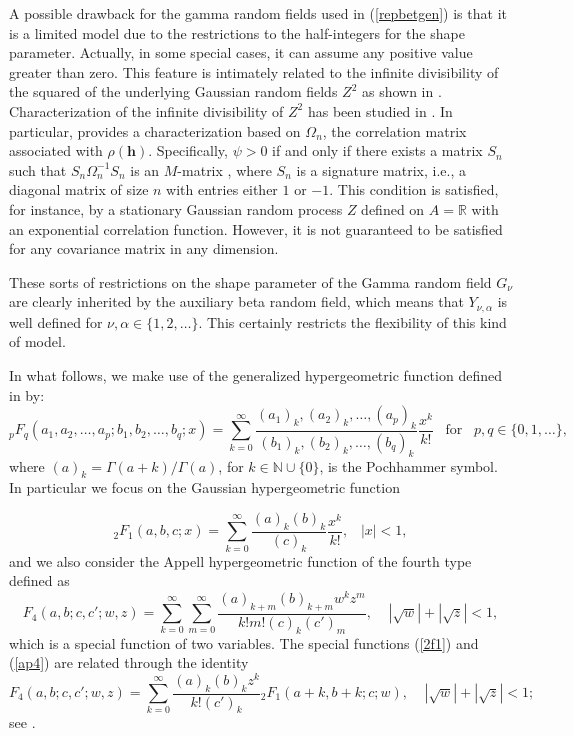 \documentclass[times,sort&compress,3p]{elsarticle}
\theoremstyle{plain}%
\theoremstyle{definition}
\def\NN{\mathbb{N}}
\def\hh{\bm{h}}
\def\RR{\mathbb{R}}
\begin{document}
A possible drawback for the gamma random fields used in (\ref{repbetgen}) is that it is a limited model due to the restrictions to the half-integers for the shape parameter. Actually, in some special  cases, it can assume any positive value greater than zero. This feature is intimately related to the infinite divisibility of the squared of the underlying Gaussian random fields $Z^2$ as shown in \cite{Kri:rao:1961}. Characterization of the infinite  divisibility of $Z^2$ has been studied in \cite{Bapat:1989,Eisenbaum:Kaspi:2006,Griffiths:1970,Vere-Jones:1997}. In particular, \citet{Bapat:1989} provides a characterization based on $\Omega_n$, the correlation matrix associated with $\rho(\hh)$. Specifically,  $\psi >0$ if and only if there exists a matrix $S_n$ such that $S_n\Omega_n^{-1}S_n$ is an $M$-matrix \citep{plee:1977}, where $S_n$ is a signature matrix, i.e., a diagonal matrix of size $n$ with entries either $1$ or $-1$. This condition is satisfied, for instance, by a stationary Gaussian random process $Z$ defined on $A=\RR$ with  an exponential correlation function. However, it is not guaranteed to be satisfied for any covariance matrix in any dimension.

These sorts of restrictions on the shape parameter of the Gamma random field $G_{\nu}$ are clearly inherited by the   auxiliary beta random field, which means that $Y_{\nu,\alpha}$ is well defined for $\nu,\alpha\in\{1,2,\ldots\}$. This certainly restricts the flexibility of this kind of model.

In what follows, we make use of  the generalized hypergeometric function defined in \citet{Gradshteyn:Ryzhik:2007} by:
\begin{equation}\label{pfq}
{}_pF_q(a_1,a_2,\ldots,a_p;b_1,b_2,\ldots,b_q;x)=\sum\limits_{k=0}^{\infty}
\frac{(a_1)_k,(a_2)_k,\ldots,(a_p)_k}{(b_1)_k,(b_2)_k,\ldots,(b_q)_k}\frac{x^k}{k!}\;\;\;\text{for}\;\;\;p,q\in\{0,1,\ldots\},
\end{equation}
where $(a)_{k}=  \Gamma(a+k)/ \Gamma(a)$, for $k\in \NN \cup \{0\} $, is the Pochhammer symbol.
In particular we focus on  the Gaussian hypergeometric function

\begin{equation}\label{2f1}
{}_2F_1(a,b,c;x)=\sum\limits_{k=0}^{\infty}\frac{(a)_k (b)_k}{(c)_k}\frac{x^k}{k!},\;\;\; |x|<1,
\end{equation}
and we  also consider  the Appell hypergeometric  function of the fourth type  \citep{Gradshteyn:Ryzhik:2007} defined as
\begin{equation}\label{ap4}
F_4(a,b;c,c';w,z)=\sum\limits_{k=0}^{\infty}\sum\limits_{m=0}^{\infty}\frac{(a)_{k+m}(b)_{k+m}w^kz^m}{k!m!(c)_k(c')_m},\;\;\;\;|\sqrt{w}|+|\sqrt{z}|<1,
\end{equation}
which is a special function  of two variables.
The  special functions (\ref{2f1}) and (\ref{ap4}) are related through the identity
\begin{equation}\label{apell4}
F_4(a,b;c,c';w,z)=\sum\limits_{k=0}^{\infty}\frac{(a)_{k}(b)_{k}z^k}{k!(c')_k}{}_2F_1(a+k,b+k;c;w),\;\;\;\;|\sqrt{w}|+|\sqrt{z}|<1;
\end{equation}
see \citep{Brychkov:Saad:2017}.
\end{document}
